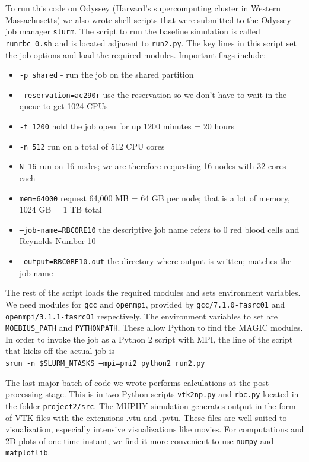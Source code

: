 \documentclass[11pt]{article} %
\newcommand{\tty}[1]{\texttt{#1}}
\begin{document}
To run this code on Odyssey (Harvard's supercomputing cluster in Western Massachusetts)
we also wrote shell scripts that were submitted to the Odyssey job manager \tty{slurm}.
The script to run the baseline simulation is called \tty{runrbc\_0.sh} and is located adjacent to \tty{run2.py}.  
The key lines in this script set the job options and load the required modules.  
Important flags include:
\begin{itemize}
\item \tty{-p shared} - run the job on the shared partition
\item \tty{--reservation=ac290r} use the reservation so we don't have to wait in the queue to get 1024 CPUs 
\item \tty{-t 1200} hold the job open for up 1200 minutes = 20 hours
\item \tty{-n 512} run on a total of 512 CPU cores
\item \tty{N 16} run on 16 nodes; we are therefore requesting 16 nodes with 32 cores each
\item \tty{mem=64000} request 64,000 MB = 64 GB per node; that is a lot of memory, 1024 GB = 1 TB total
\item \tty{--job-name=RBC0RE10} the descriptive job name refers to 0 red blood cells and Reynolds Number 10
\item \tty{--output=RBC0RE10.out} the directory where output is written; matches the job name
\end{itemize}

The rest of the script loads the required modules and sets environment variables.
We need modules for \tty{gcc} and \tty{openmpi}, provided by 
\tty{gcc/7.1.0-fasrc01} and \tty{openmpi/3.1.1-fasrc01} respectively.
The environment variables to set are \tty{MOEBIUS\_PATH} and \tty{PYTHONPATH}.
These allow Python to find the MAGIC modules.
In order to invoke the job as a Python 2 script with MPI, the 
line of the script that kicks off the actual job is\\
\tty{srun -n \$SLURM\_NTASKS --mpi=pmi2 python2 run2.py}

The last major batch of code we wrote performs calculations at the post-processing stage.
This is in two Python scripts \tty{vtk2np.py} and \tty{rbc.py} located in the folder \tty{project2/src}.
The MUPHY simulation generates output in the form of VTK files with the extensions .vtu and .pvtu.
These files are well suited to visualization, especially intensive visualizations like movies.
For computations and 2D plots of one time instant, we find it more convenient to use 
\tty{numpy} and \tty{matplotlib}.
\end{document}
